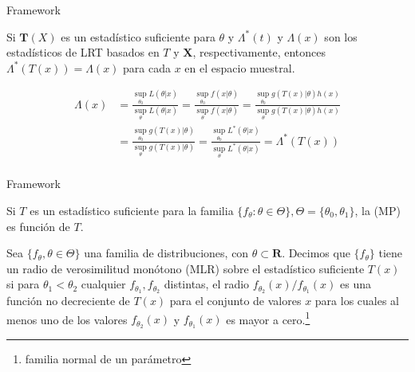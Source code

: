 \documentclass{beamer}
\begin{document}
\begin{frame}{Framework}
\begin{theorem}
Si $\mathbf{T}(X)$ es un estadístico suficiente para $\theta$ y $\Lambda^*(t)$ y $\Lambda(x)$ son los estadísticos de LRT basados en $T$ y $\mathbf{X}$, respectivamente, entonces $\Lambda^*(T(x)) = \Lambda(x)$ para cada $x$ en el espacio muestral.
\end{theorem}
\[
\begin{split}
\Lambda(x) & = \frac{ \sup_{\theta_0} L(\theta | x)}{\sup_{\theta} L(\theta | x)}
 			 = \frac{\sup_{\theta_0} f( x| \theta) }{\sup_{\theta} f( x| \theta)}
 			 = \frac{\sup_{\theta_0} g( T(x)| \theta)h(x) }{\sup_{\theta} g( T(x)| \theta)h(x)}\\
			 & = \frac{\sup_{\theta_0} g( T(x)| \theta) }{\sup_{\theta} g( T(x)| \theta)}
			 = \frac{ \sup_{\theta_0} L^*(\theta | x)}{\sup_{\theta} L^*(\theta | x)}
			  = \Lambda^*(T(x))  \\
\end{split}
\] 
\end{frame}

\begin{frame}{Framework}
\begin{theorem}
Si $T$ es un estadístico suficiente para la familia $\{ f_\theta: \theta \in \Theta\}, \Theta = \{\theta_0, \theta_1\}$, la (MP) es función de $T$.
\end{theorem}
\begin{definition}
Sea $\{ f_\theta, \theta  \in \Theta \}$ una familia de distribuciones, con $\theta \subset \mathbf{R}$. Decimos que $\{f_\theta \}$ tiene un radio de verosimilitud monótono (MLR) sobre el estadístico suficiente $T(x)$ si para $\theta_1 < \theta_2$ cualquier $f_{\theta_1},f_{\theta_2}$ distintas, el radio $f_{\theta_2}(x)/ f_{\theta_1}(x)$ es una función no decreciente de $T(x)$ para el conjunto de valores $x$ para los cuales al menos uno de los valores $f_{\theta_2}(x) $ y $f_{\theta_1}(x)$ es mayor a cero.\footnote{familia normal de un parámetro}
\end{definition}
\end{frame}
\end{document}
